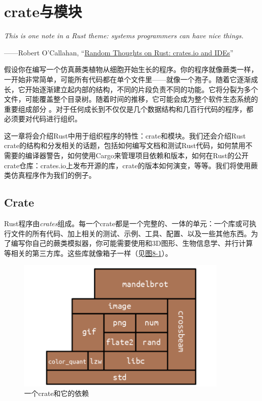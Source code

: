 \chapter{crate与模块}\label{ch08}

\emph{This is one note in a Rust theme: systems programmers can have nice things.}

\begin{flushright}
    ——Robert O'Callahan, “\href{https://robert.ocallahan.org/2016/08/random-thoughts-on-rust-cratesio-and.html}{Random Thoughts on Rust: crates.io and IDEs}”
\end{flushright}

假设你在编写一个仿真蕨类植物从细胞开始生长的程序。你的程序就像蕨类一样，一开始非常简单，可能所有代码都在单个文件里——就像一个孢子。随着它逐渐成长，它开始逐渐建立起内部的结构，不同的片段负责不同的功能。它将分裂为多个文件，可能覆盖整个目录树。随着时间的推移，它可能会成为整个软件生态系统的重要组成部分 。对于任何成长到不仅仅是几个数据结构和几百行代码的程序，都必须要对代码进行组织。

这一章将会介绍Rust中用于组织程序的特性：crate和模块。我们还会介绍Rust crate的结构和分发相关的话题，包括如何编写文档和测试Rust代码，如何禁用不需要的编译器警告，如何使用Cargo来管理项目依赖和版本，如何在Rust的公开crate仓库：crates.io上发布开源的库，crate的版本如何演变，等等。我们将使用蕨类仿真程序作为我们的例子。

\section{Crate}

Rust程序由\emph{crates}组成。每一个crate都是一个完整的、一体的单元：一个库或可执行文件的所有代码、加上相关的测试、示例、工具、配置、以及一些其他东西。为了编写你自己的蕨类模拟器，你可能需要使用和3D图形、生物信息学、并行计算等相关的第三方库。这些库就像箱子一样（见\hyperref[f8-1]{图8-1}）。

\begin{figure}[htbp]
    \centering
    \includegraphics[width=0.9\textwidth]{../img/f8-1.png}
    \caption{一个crate和它的依赖}
    \label{f8-1}
\end{figure}

